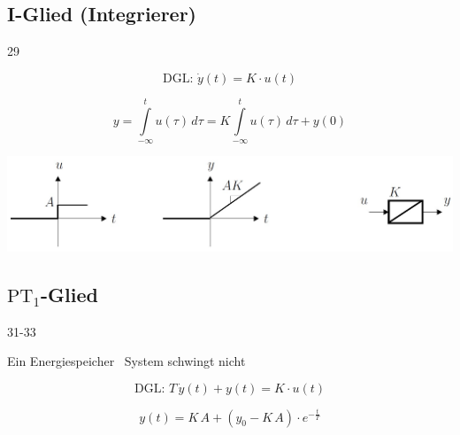 \subsection{I-Glied (Integrierer)}{29}

\begin{minipage}{0.48\columnwidth}
    $$ \boxed{ \text{DGL: } \dot{y}(t) = K \cdot u(t) }  $$
\end{minipage}
\hfill
\begin{minipage}{0.48\columnwidth}
    $$ \boxed{ \scriptstyle{ y = \int\limits_{- \infty}^t u(\tau) \, d \tau = K \int\limits_{- \infty}^t u(\tau) \, d \tau + y(0) } }$$
\end{minipage}

\includegraphics[width=0.9\columnwidth]{images/i-glied} 


\subsection[PT1-Glied]{$\text{PT}_1$-Glied}{31-33}

Ein Energiespeicher \textrightarrow\ System schwingt nicht

\begin{minipage}{0.48\columnwidth}
    $$ \boxed{ \text{DGL: } T \, \dot{y}(t) + y(t) = K \cdot u(t) }  $$
\end{minipage}
\hfill
\begin{minipage}{0.48\columnwidth}
    $$ \boxed{ y(t) = K \, A + (y_0 - K \, A) \cdot e^{- \frac{t}{T}} } $$
\end{minipage}



